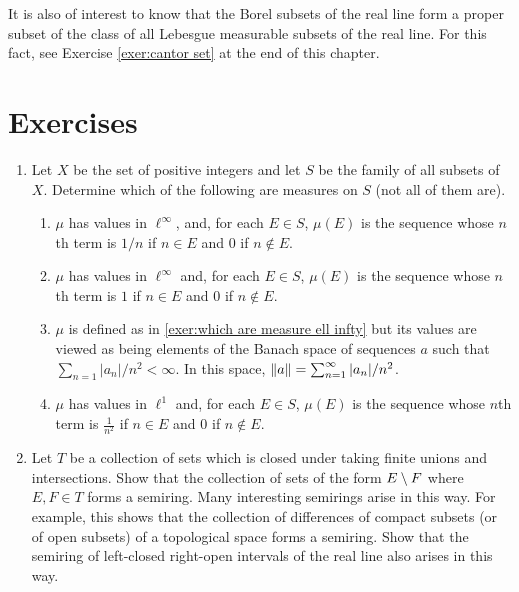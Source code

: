 It is also of interest to know that the Borel subsets of the real line form a proper subset of the class of all Lebesgue measurable subsets of the real line. For this fact, see Exercise \ref{exer:cantor set} at the end of this chapter.

\section{Exercises}

\begin{enumerate}[label=\arabic*),ref=\arabic*]
\item\label{exer:ex of measures}
Let $X$ be the set of positive integers and let $S$ be the family of all subsets of $X$. Determine which of the following are measures on $S$ (not all of them are).
\begin{enumerate}[label=\alph*),ref=\alph*)]
    \item $\mu$ has values in $\ell^\infty$, and, for each $E \in S$, $\mu(E)$ is the sequence whose $n$th term is $1 / n$ if $n \in E$ and 0 if $n \notin E$.
    
    \item\label{exer:which are measure ell infty}
    $\mu$ has values in $\ell^\infty$ and, for each $E \in S$, $\mu(E)$ is the sequence whose $n$th term is $1$ if $n \in E$ and $0$ if $n \notin E$.
    
    \item $\mu$ is defined as in \ref{exer:which are measure ell infty} but its values are viewed as being elements of the Banach space of sequences $a$ such that $\sum_{n=1}|a_n|/n^2<\infty$. In this space, $\norm{a}=\sum_{n=1}^\infty|a_n|/n^2$.
    
    \item $\mu$ has values in $\ell^1$ and, for each $E\in S$, $\mu(E)$ is the sequence whose $n$th term is $\frac1{n^2}$ if $n\in E$ and $0$ if $n\notin E$.
\end{enumerate}

\item Let $T$ be a collection of sets which is closed under taking finite unions and intersections. Show that the collection of sets of the form $E\setminus F$ where $E,F\in T$ forms a semiring. Many interesting semirings arise in this way. For example, this shows that the collection of differences of compact subsets (or of open subsets) of a topological space forms a semiring. Show that the semiring of left-closed right-open intervals of the real line also arises in this way.


\end{enumerate}
